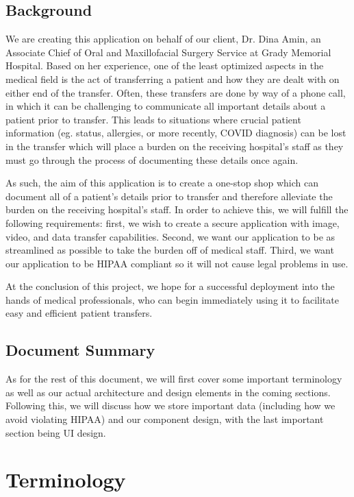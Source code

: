 \documentclass[11pt,letterpaper]{article}
\begin{document}
\subsection{Background}

We are creating this application on behalf of our client, Dr. Dina Amin, an Associate Chief of Oral and Maxillofacial Surgery Service at Grady Memorial Hospital. Based on her experience, one of the least optimized aspects in the medical field is the act of transferring a patient and how they are dealt with on either end of the transfer. Often, these transfers are done by way of a phone call, in which it can be challenging to communicate all important details about a patient prior to transfer. This leads to situations where crucial patient information (eg. status, allergies, or more recently, COVID diagnosis) can be lost in the transfer which will place a burden on the receiving hospital's staff as they must go through the process of documenting these details once again. 

As such, the aim of this application is to create a one-stop shop which can document all of a patient's details prior to transfer and therefore alleviate the burden on the receiving hospital's staff. In order to achieve this, we will fulfill the following requirements: first, we wish to create a secure application with image, video, and data transfer capabilities. Second, we want our application to be as streamlined as possible to take the burden off of medical staff. Third, we want our application to be HIPAA compliant so it will not cause legal problems in use.  

At the conclusion of this project, we hope for a successful deployment into the hands of medical professionals, who can begin immediately using it to facilitate easy and efficient patient transfers.
\subsection{Document Summary}
As for the rest of this document, we will first cover some important terminology as well as our actual architecture and design elements in the coming sections. Following this, we will discuss how we store important data (including how we avoid violating HIPAA) and our component design, with the last important section being UI design.
\section{Terminology}
\end{document}
